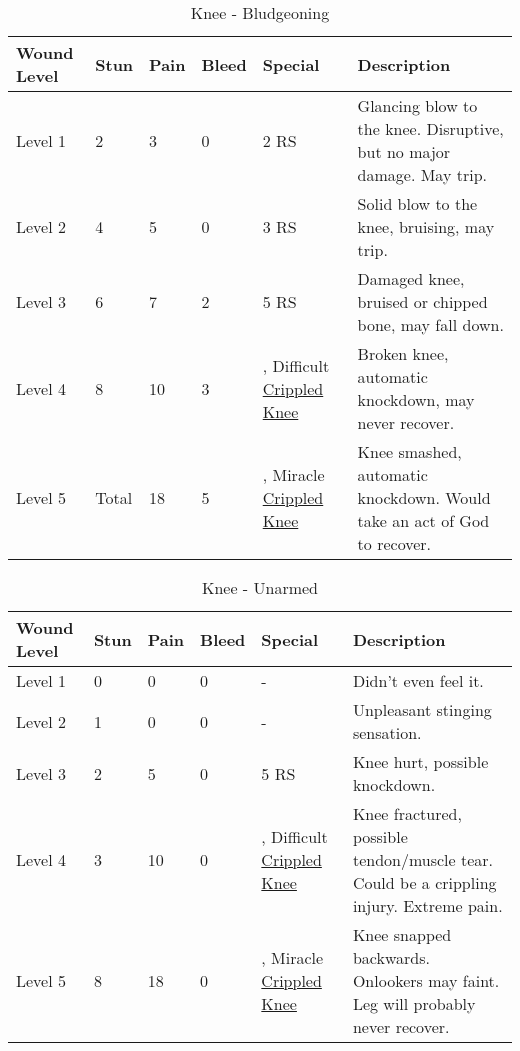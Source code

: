 \documentclass[oneside,11pt,english]{book}
\begin{document}
\begin{table}[hb] %
	\caption{Knee - Bludgeoning}
	\label{wound:Knee - Bludgeoning}
	\begin{tabu} to 
Wound Level &Stun &Pain &Bleed &Special &Description\\\toprule
Level 1 &2 &3 &0 & 2 RS &Glancing blow to the knee. Disruptive, but no major damage. May trip.\\
Level 2 &4 &5& 0&  3 RS &Solid blow to the knee, bruising, may trip.\\
Level 3 &6 &7& 2&  5 RS &Damaged knee, bruised or chipped bone, may fall down.\\
Level 4 &8 &10& 3& , \newline
Difficult~ \hyperref[bane:Crippled Limb/Appendage]{Crippled Knee} &Broken knee, automatic knockdown, may never recover.\\
Level 5 &Total &18 &5 &, \newline
	Miracle~ \hyperref[bane:Crippled Limb/Appendage]{Crippled Knee} &Knee smashed, automatic knockdown. Would take an act of God to recover.\\
	\end{tabu}
\end{table}

\begin{table}[!hb] %
	\caption{Knee - Unarmed}
	\label{wound:Knee - Unarmed}
	\begin{tabu} to 
Wound Level &Stun &Pain &Bleed &Special &Description\\\toprule
Level 1& 0& 0& 0& - &Didn’t even feel it.\\
Level 2& 1& 0& 0& - &Unpleasant stinging sensation.\\
Level 3& 2& 5& 0& 5 RS &Knee hurt, possible knockdown.\\
Level 4& 3& 10& 0& , \newline 
Difficult~ \hyperref[bane:Crippled Limb/Appendage]{Crippled Knee} &Knee fractured, possible tendon/muscle tear. Could be a crippling injury. Extreme pain.\\
Level 5& 8& 18& 0& , \newline
Miracle~ \hyperref[bane:Crippled Limb/Appendage]{Crippled Knee} &Knee snapped backwards. Onlookers may faint. Leg will probably never recover.\\
	\end{tabu}
\end{table}
	\clearpage
\end{document}
